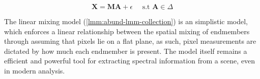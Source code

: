 \begin{equation}
    \label{lmm:abund-lmm-collection}
    \mathbf{X} = \mathbf{M} \mathbf{A} + \epsilon \quad \text{ s.t } \mathbf{A} \in \Delta
\end{equation}

The linear mixing model (\eqref{lmm:abund-lmm-collection}) is an simplistic model, which enforces a linear relationship between the spatial mixing of endmembers through assuming that pixels lie on a flat plane, as such, pixel measurements are dictated by how much each endmember is present. The model itself remains a efficient and powerful tool for extracting spectral information from a scene, even in modern analysis.